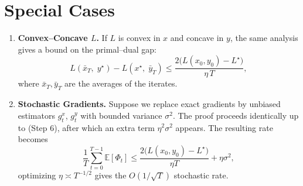 \documentclass{article}
\newcommand{\E}{\mathbb{E}}
\begin{document}
\section*{Special Cases}
\begin{enumerate}
\item \textbf{Convex–Concave $L$.} If $L$ is convex in $x$ and concave in $y$, the same analysis gives a bound on the primal–dual gap:
\[
L(\bar x_T,\;y^\star)-L(x^\star,\;\bar y_T)\le
\frac{2\big(L(x_0,y_0)-L^\star\big)}{\eta\,T},
\]
where $\bar x_T,\bar y_T$ are the averages of the iterates.
\item \textbf{Stochastic Gradients.} Suppose we replace exact gradients by unbiased estimators $g^x_t$, $g^y_t$ with bounded variance $\sigma^2$.  The proof proceeds identically up to (Step 6), after which an extra term $\eta^2\sigma^2$ appears.  The resulting rate becomes
\[
\frac{1}{T}\sum_{t=0}^{T-1}\E[\Phi_t]\le
\frac{2\big(L(x_0,y_0)-L^\star\big)}{\eta T}+ \eta\sigma^2,
\]
optimizing $\eta\asymp T^{-1/2}$ gives the $O(1/\sqrt{T})$ stochastic rate.
\end{enumerate}
\end{document}
